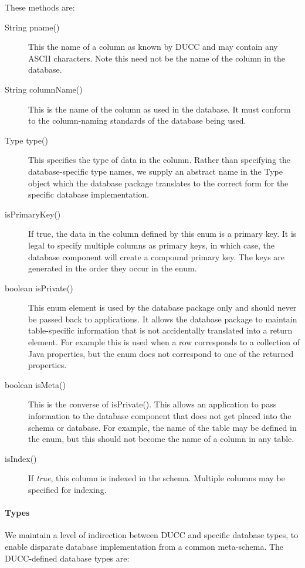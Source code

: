      These methods are:
     \begin{description}
       \item[String pname()] This the name of a column as known by DUCC and may contain any ASCII
         characters.  Note this need not be the name of the column in the database.
       \item[String columnName()] This is the name of the column as used in the database.  It must
         conform to the column-naming standards of the database being used.  
       \item[Type type()] This specifies the type of data in the column.  Rather than specifying the
         database-specific type names, we supply an abstract name in the Type object which the
         database package translates to the correct form for the specific database implementation.
       \item[isPrimaryKey()] If true, the data in the column defined by this enum is a primary key.
         It is legal to specify multiple columns as primary keys, in which case, the database
         component will create a compound primary key.  The keys are generated in the order
         they occur in the enum.
       \item[boolean isPrivate()] This enum element is used by the database package only and
         should never be passed back to applications.  It allows the
         database package to maintain table-specific information that is not accidentally 
         translated into a return element. For example this is used when a row corresponds to
         a collection of Java properties, but the enum does not correspond to one of the
         returned properties.
       \item[boolean isMeta()]  This is the converse of isPrivate().  This allows
         an application to pass information to the database component that does not get
         placed into the schema or database.  For example, the name of the table may be
         defined in the enum, but this should not become the name of a column in any table.
       \item[isIndex()] If {\em true}, this column is indexed in the schema.  Multiple columns
         may be specified for indexing.
       \end{description}
     
     \paragraph{Types} We maintain a level of indirection between DUCC and specific database types, to enable
     disparate database implementation from a common meta-schema.  The DUCC-defined database
     types are:

